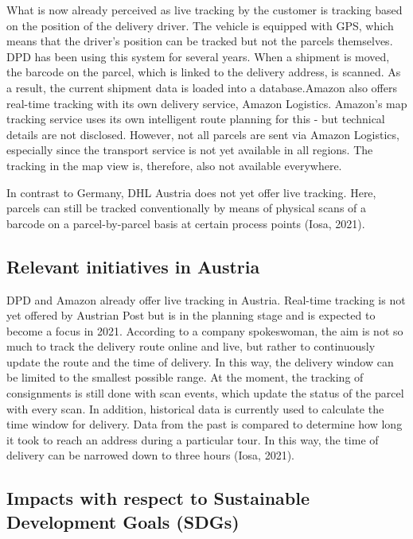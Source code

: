 \documentclass[
]{book}
\begin{document}
What is now already perceived as live tracking by the customer is tracking based on the position of the delivery driver. The vehicle is equipped with GPS, which means that the driver's position can be tracked but not the parcels themselves. DPD has been using this system for several years. When a shipment is moved, the barcode on the parcel, which is linked to the delivery address, is scanned. As a result, the current shipment data is loaded into a database.Amazon also offers real-time tracking with its own delivery service, Amazon Logistics. Amazon's map tracking service uses its own intelligent route planning for this - but technical details are not disclosed. However, not all parcels are sent via Amazon Logistics, especially since the transport service is not yet available in all regions. The tracking in the map view is, therefore, also not available everywhere.

In contrast to Germany, DHL Austria does not yet offer live tracking. Here, parcels can still be tracked conventionally by means of physical scans of a barcode on a parcel-by-parcel basis at certain process points (Iosa, 2021).

\hypertarget{relevant-initiatives-in-austria-28}{%
\subsection*{Relevant initiatives in Austria}\label{relevant-initiatives-in-austria-28}}

DPD and Amazon already offer live tracking in Austria. Real-time tracking is not yet offered by Austrian Post but is in the planning stage and is expected to become a focus in 2021. According to a company spokeswoman, the aim is not so much to track the delivery route online and live, but rather to continuously update the route and the time of delivery. In this way, the delivery window can be limited to the smallest possible range. At the moment, the tracking of consignments is still done with scan events, which update the status of the parcel with every scan.
In addition, historical data is currently used to calculate the time window for delivery. Data from the past is compared to determine how long it took to reach an address during a particular tour. In this way, the time of delivery can be narrowed down to three hours (Iosa, 2021).

\hypertarget{impacts-with-respect-to-sustainable-development-goals-sdgs-28}{%
\subsection*{Impacts with respect to Sustainable Development Goals (SDGs)}\label{impacts-with-respect-to-sustainable-development-goals-sdgs-28}}
\end{document}
